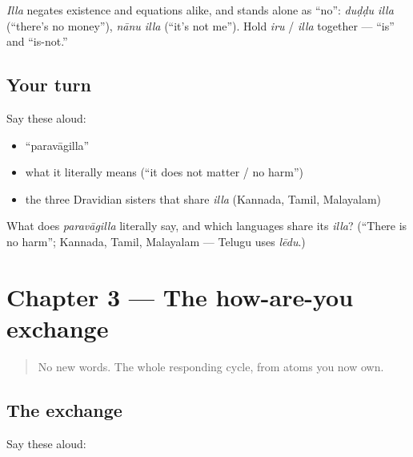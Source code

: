 \begin{grammarlens}[title={Grammar Lens: \kn{ಇಲ್ಲ}, the all-purpose \textquotedblleft{}no\textquotedblright{}}]
\emph{Illa} negates existence and equations alike, and stands alone as \textquotedblleft{}no\textquotedblright{}: \emph{duḍḍu illa} (\textquotedblleft{}there's no money\textquotedblright{}), \emph{nānu illa} (\textquotedblleft{}it's not me\textquotedblright{}). Hold \emph{iru} / \emph{illa} together — \textquotedblleft{}is\textquotedblright{} and \textquotedblleft{}is-not.\textquotedblright{}
\end{grammarlens}

\subsection*{Your turn}
Say these aloud:

\begin{itemize}
\raggedright
  \item \textquotedblleft{}paravāgilla\textquotedblright{}
  \item what it literally means (\textquotedblleft{}it does not matter / no harm\textquotedblright{})
  \item the three Dravidian sisters that share \emph{illa} (Kannada, Tamil, Malayalam)
\end{itemize}

\begin{tcolorbox}[breakable,colback=teal!4,colframe=teal!35!black,title={Before you move on}]
What does \emph{paravāgilla} literally say, and which languages share its \emph{illa}? (\textquotedblleft{}There is no harm\textquotedblright{}; Kannada, Tamil, Malayalam — Telugu uses \emph{lēdu}.)
\end{tcolorbox}
\section[Practice]{Chapter 3 — The how-are-you exchange}

\label{lesson:KA-C03-practice}



\begin{quote}
No new words. The whole responding cycle, from atoms you now own.
\end{quote}

\subsection*{The exchange}
Say these aloud:

